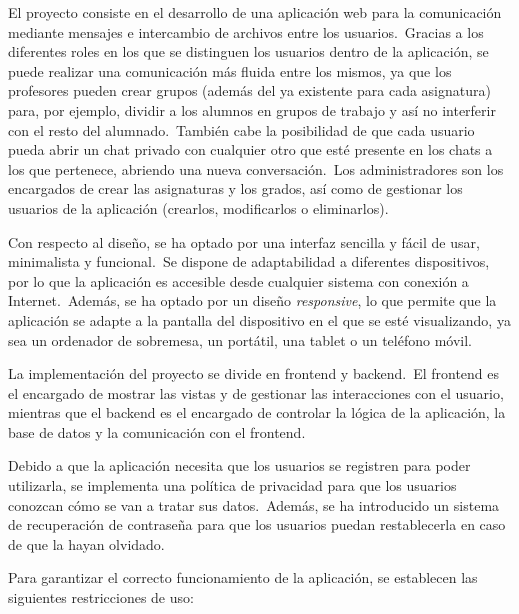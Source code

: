 

El proyecto consiste en el desarrollo de una aplicación web para la comunicación mediante mensajes e intercambio de
archivos entre los usuarios.\ Gracias a los diferentes roles en los que se distinguen los usuarios dentro de la
aplicación, se puede
realizar una comunicación más fluida entre los mismos, ya que los profesores pueden crear grupos (además del ya
existente para cada asignatura) para, por ejemplo, dividir a los alumnos en grupos de trabajo y así no interferir con
el resto del alumnado.\ También cabe la posibilidad de que cada usuario pueda abrir un chat privado con cualquier
otro que esté presente en los chats a los que pertenece, abriendo una nueva conversación.\ Los administradores son
los encargados de crear las asignaturas y los grados, así como de gestionar los usuarios de la aplicación (crearlos,
modificarlos o eliminarlos).

Con respecto al diseño, se ha optado por una interfaz sencilla y fácil de usar, minimalista y funcional.\ Se dispone
de adaptabilidad a diferentes dispositivos, por lo que la aplicación es accesible desde cualquier sistema con
conexión a Internet.\ Además, se ha optado por un diseño \textit{responsive}, lo que permite que la aplicación se
adapte a la
pantalla del dispositivo en el que se esté visualizando, ya sea un ordenador de sobremesa, un portátil, una tablet o un
teléfono móvil.

La implementación del proyecto se divide en frontend y backend.\ El frontend es el encargado de mostrar las vistas
y de gestionar las interacciones con el usuario, mientras que el backend es el encargado de controlar la lógica de
la aplicación, la base de datos y la comunicación con el frontend.

Debido a que la aplicación necesita que los usuarios se registren para poder utilizarla, se implementa una política de
privacidad para que los usuarios conozcan cómo se van a tratar sus datos.\ Además, se ha introducido un sistema de
recuperación de contraseña para que los usuarios puedan restablecerla en caso de que la hayan olvidado.


Para garantizar el correcto funcionamiento de la aplicación, se establecen las siguientes restricciones de uso:

